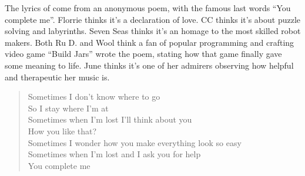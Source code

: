 
The lyrics of  come from an anonymous poem, with the famous last words ``You complete me''. Florrie thinks it's a declaration of love. CC thinks it's about puzzle solving and labyrinths. Seven Seas thinks it's an homage to the most skilled robot makers. Both Ru D. and Wool think a fan of popular programming and crafting video game ``Build Jars'' wrote the poem, stating how that game finally gave some meaning to life. June thinks it's one of her admirers observing how helpful and therapeutic her music is. \\

\begin{verse}
Sometimes I don't know where to go \\
So I stay where I'm at \\
Sometimes when I'm lost I'll think about you \\
How you like that? \\
Sometimes I wonder how you make everything look so easy \\
Sometimes when I'm lost and I ask you for help \\
You complete me
\end{verse}

\clearpage
